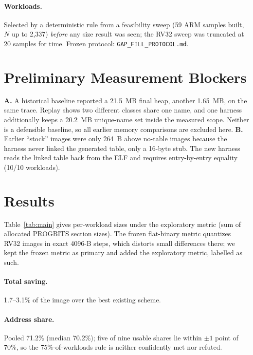 \documentclass[10pt,twocolumn]{article}
\begin{document}
\paragraph{Workloads.} Selected by a deterministic rule from a feasibility sweep (59 ARM samples built, $N$ up to 2{,}337) \emph{before} any size result was seen; the RV32 sweep was truncated at 20 samples for time. Frozen protocol: \texttt{GAP\_FILL\_PROTOCOL.md}.

\section{Preliminary Measurement Blockers}
\textbf{A.} A historical baseline reported a 21.5~MB final heap, another 1.65~MB, on the same trace. Replay shows two different classes share one name, and one harness additionally keeps a 20.2~MB unique-name set inside the measured scope. Neither is a defensible baseline, so all earlier memory comparisons are excluded here.
\textbf{B.} Earlier ``stock'' images were only 264~B above no-table images because the harness never linked the generated table, only a 16-byte stub. The new harness reads the linked table back from the ELF and requires entry-by-entry equality (10/10 workloads).

\section{Results}
Table~\ref{tab:main} gives per-workload sizes under the exploratory metric (sum of allocated PROGBITS section sizes). The frozen flat-binary metric quantizes RV32 images in exact 4096-B steps, which distorts small differences there; we kept the frozen metric as primary and added the exploratory metric, labelled as such.

\begin{table}[t]\centering\small\setlength{\tabcolsep}{4pt}

\caption{Bytes of flash image per scheme class (exploratory metric). $E$: best existing; $H$: best hardened control; $P$: front-coded dictionary. $g$: residual name-coding gain. \texttt{net\_ptp} omitted (non-converged baseline).}\label{tab:main}
\end{table}

\paragraph{Total saving.} 1.7--3.1\% of the image over the best existing scheme.
\paragraph{Address share.} Pooled 71.2\% (median 70.2\%); five of nine usable shares lie within $\pm1$ point of 70\%, so the 75\%-of-workloads rule is neither confidently met nor refuted.
\end{document}
